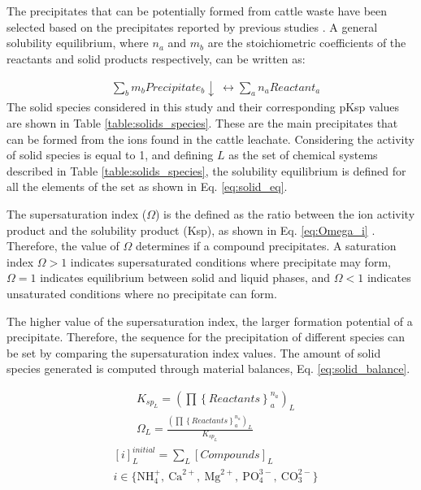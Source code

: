 \documentclass[10pt,a4paper]{article}
\begin{document}
The precipitates that can be potentially formed from cattle waste have been selected based on the precipitates reported by previous studies . A general solubility equilibrium, where $n_{a}$ and $m_{b}$ are the stoichiometric coefficients of the reactants and solid products respectively, can be written as:

\begin{align}
& \sum_{b} m_{b} Precipitate_{b}\downarrow  \ \leftrightarrow \sum_{a} n_{a} Reactant_{a}
\end{align}
The solid species considered in this study and their corresponding pKsp values are shown in Table \ref{table:solids_species}. These are the main precipitates that can be formed from the ions found in the cattle leachate. Considering the activity of solid species is equal to 1, and defining $L$ as the set of chemical systems described in Table \ref{table:solids_species}, the solubility equilibrium is defined for all the elements of the set as shown in Eq. \ref{eq:solid_eq}.

The supersaturation index ($\Omega$) is the defined as the ratio between the ion activity product and the solubility product (Ksp), as shown in Eq. \ref{eq:Omega_i} . Therefore, the value of $\Omega$ determines if a compound precipitates. A saturation index $\Omega > 1$ indicates supersaturated conditions where precipitate may form, $\Omega =1 $ indicates equilibrium between solid and liquid phases, and $\Omega < 1$ indicates unsaturated conditions where no precipitate can form. 

The higher value of the supersaturation index, the larger formation potential of a precipitate. Therefore, the sequence for the precipitation of different species can be set by comparing the supersaturation index values. The amount of solid species generated is computed through material balances, Eq. \ref{eq:solid_balance}.

\begin{align} 
& K_{sp_{L}}   = \left( \prod \left\{ Reactants \right\}_{a}^{n_{a}} \right)_{L} \label{eq:solid_eq}\\
& \Omega_{L}= \frac{ \left( \prod \left\{ Reactants \right\}_{a}^{n_{a}} \right)_{L} }{ K_{sp_{L}}  } \label{eq:Omega_i}
\end{align}
\begin{align}
& \left[ i \right]_{L}^{initial} =  \sum_{L} \left[Compounds\right]_{L} \label{eq:solid_balance} \\
& i \in \bigl\{\text{NH}_{4}^{+}, \ \text{Ca}^{2+}, \ \text{Mg}^{2+}, \ \text{PO}_{4}^{3-}, \ \text{CO}_{3}^{2-} \bigr\} \nonumber 
\end{align}
\end{document}
